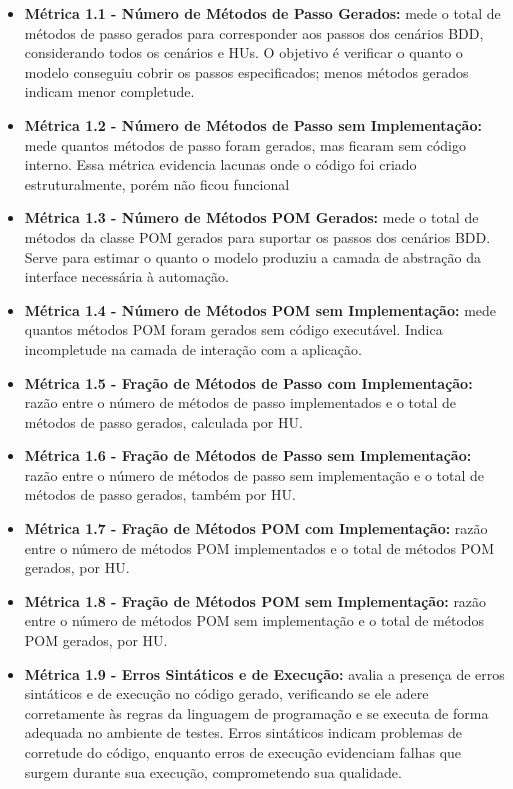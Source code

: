 \begin{itemize}
    \item \textbf{Métrica 1.1 - Número de Métodos de Passo Gerados:} mede o total de métodos de passo gerados para corresponder aos passos dos cenários BDD, considerando todos os cenários e HUs. O objetivo é verificar o quanto o modelo conseguiu cobrir os passos especificados; menos métodos gerados indicam menor completude.
    \item \textbf{Métrica 1.2 - Número de Métodos de Passo sem Implementação:} mede quantos métodos de passo foram gerados, mas ficaram sem código interno. Essa métrica evidencia lacunas onde o código foi criado estruturalmente, porém não ficou funcional
    \item \textbf{Métrica 1.3 - Número de Métodos POM Gerados:} mede o total de métodos da classe POM gerados para suportar os passos dos cenários BDD. Serve para estimar o quanto o modelo produziu a camada de abstração da interface necessária à automação.
    \item \textbf{Métrica 1.4 - Número de Métodos POM sem Implementação:} mede quantos métodos POM foram gerados sem código executável. Indica incompletude na camada de interação com a aplicação.
    \item \textbf{Métrica 1.5 - Fração de Métodos de Passo com Implementação:} razão entre o número de métodos de passo implementados e o total de métodos de passo gerados, calculada por HU.
    \item \textbf{Métrica 1.6 - Fração de Métodos de Passo sem Implementação:} razão entre o número de métodos de passo sem implementação e o total de métodos de passo gerados, também por HU.
    \item \textbf{Métrica 1.7 - Fração de Métodos POM com Implementação:} razão entre o número de métodos POM implementados e o total de métodos POM gerados, por HU.
    \item \textbf{Métrica 1.8 - Fração de Métodos POM sem Implementação:} razão entre o número de métodos POM sem implementação e o total de métodos POM gerados, por HU.
    \item \textbf{Métrica 1.9 - Erros Sintáticos e de Execução:} avalia a presença de erros sintáticos e de execução no código gerado, verificando se ele adere corretamente às regras da linguagem de programação e se executa de forma adequada no ambiente de testes. Erros sintáticos indicam problemas de corretude do código, enquanto erros de execução evidenciam falhas que surgem durante sua execução, comprometendo sua qualidade.
\end{itemize}

